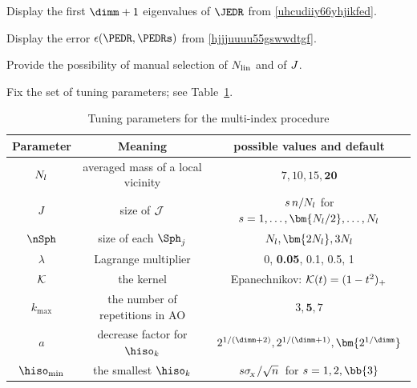 {\color{blue} 
\begin{mylist}
\item 
Display the first \( \dimm + 1 \) eigenvalues of \( \JEDR \) from \eqref{uhcudiiy66yhjikfed}.

\item 
Display the error \( \epsilon(\PEDR , \PEDRs) \) from \eqref{hjjjuuuu55gswwdtgf}.

\item
Provide the possibility of manual selection of \( N_{\operatorname{lin}} \) and of \( J \).
\end{mylist}
}

\label{SEDRmiproc}


Fix the set of tuning parameters; see Table~\ref{TdefMI}.
\begin{table}[h]
\begin{tabular}{c|c|c}
        \hline
        Parameter & Meaning & possible values and default \\
        \hline
        \( N_{l} \) & averaged mass of a local vicinity & \( 7,10, 15, \bm{20} \) \\
        \( J \) & size of \( \mathcal{J} \) 				& \( s \, n/N_{l} \) for \( s=1, \ldots, \bm{\nmin/2}, \ldots, \nmin \) \\
		\( \nSph \) & size of each \( \Sph_{j} \)		& \( \nmin, \bm{2\nmin}, 3\nmin \) \\
		\( \lambda \) & Lagrange multiplier 		& 0, \textbf{0.05}, {0.1}, 0.5, 1 \\
		\( \mathcal{K} \) & the kernel & Epanechnikov: \( \mathcal{K}(t) = (1-t^{2})_{+} \) \\
		\( k_{\max} \) & the number of repetitions in AO & \( 3, \bm{5}, 7 \) \\
		\( a \)	& decrease factor for \( \hiso_{k} \) & \( 2^{1/(\dimm+2)}, {2^{1/(\dimm+1)}}, \bm{2^{1/\dimm}} \) \\
		\( \hiso_{\min} \) & the smallest \( \hiso_{k} \) & \( s \sigma_{\!_{X}}/\sqrt{n} \, \) for \( s=1,2,\bb{3} \) \\
		\hline
    \end{tabular}
\caption{Tuning parameters for the multi-index procedure}    
\label{TdefMI}
\end{table}



